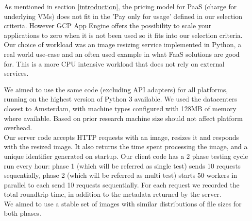 \documentclass[11pt]{article}
\begin{document}
As mentioned in section \ref{introduction}, the pricing model for PaaS (charge for underlying VMs) does not fit in the 'Pay only for usage' defined in our selection criteria. However GCP App Engine offers the possibility to scale your applications to zero when it is not been used so it fits into our selection criteria. \\

Our choice of workload was an image resizing service implemented in Python, a real world \cite{ii}
use-case and an often used example in what FaaS solutions are good for.
This is a more CPU intensive workload that
does not rely on external services.

We aimed to use the same code (excluding API adapters) for all platforms, running on the highest version of Python 3 available.
We used the datacenters closest to Amsterdam,
with machine types configured with 128MB of memory where available. Based on prior research \cite{laltre}
machine size should not affect platform overhead. \\

Our server code accepts HTTP requests with an image,
resizes it and responds with the resized image.
It also returns the time spent processing the image,
and a unique identifier generated on startup.
Our client code has a 2 phase testing cycle run every hour:
phase 1 (which will be referred as single test) sends 10 requests sequentially,
phase 2 (which will be referred as multi test) starts 50 workers in parallel to each send 10 requests sequentially.
For each request we recorded the total roundtrip time,
in addition to the metadata returned by the server. \\

We aimed to use a stable set of images with similar distributions
of file sizes for both phases.
\end{document}

